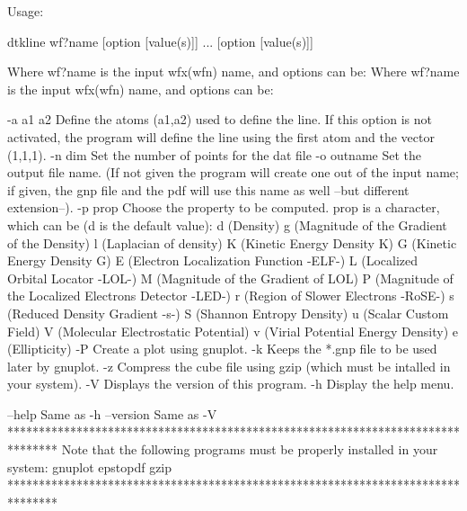 Usage:

	dtkline wf?name [option [value(s)]] ... [option [value(s)]]

Where wf?name is the input wfx(wfn) name, and options can be:
Where wf?name is the input wfx(wfn) name, and options can be:

  -a a1 a2  	Define the atoms  (a1,a2) used to define the line.
            	  If this option is not activated, the program will 
            	  define the line using the first atom and the vector
            	  (1,1,1).
  -n  dim   	Set the number of points for the dat file
  -o outname	Set the output file name.
            	  (If not given the program will create one out of
            	  the input name; if given, the gnp file and the pdf will
            	  use this name as well --but different extension--).
  -p prop	Choose the property to be computed. prop is a character,
         	  which can be (d is the default value): 
         		d (Density)
         		g (Magnitude of the Gradient of the Density)
         		l (Laplacian of density)
         		K (Kinetic Energy Density K)
         		G (Kinetic Energy Density G)
         		E (Electron Localization Function -ELF-)
         		L (Localized Orbital Locator -LOL-)
         		M (Magnitude of the Gradient of LOL)
         		P (Magnitude of the Localized Electrons Detector -LED-)
         		r (Region of Slower Electrons -RoSE-)
         		s (Reduced Density Gradient -s-)
         		S (Shannon Entropy Density)
         		u (Scalar Custom Field)
         		V (Molecular Electrostatic Potential)
         		v (Virial Potential Energy Density)
         		e (Ellipticity)
  -P     	Create a plot using gnuplot.
  -k     	Keeps the *.gnp file to be used later by gnuplot.
  -z     	Compress the cube file using gzip (which must be intalled
         	   in your system).
  -V        	Displays the version of this program.
  -h     	Display the help menu.

  --help    		Same as -h
  --version 		Same as -V
********************************************************************************
  Note that the following programs must be properly installed in your system:
                                    gnuplot
                                    epstopdf
                                      gzip
********************************************************************************
